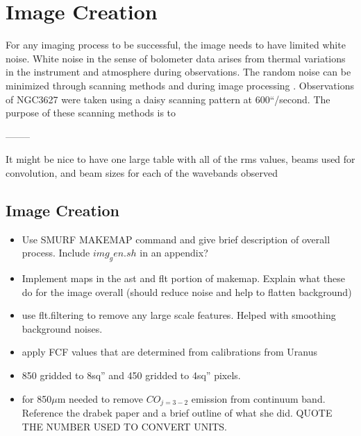 \section{Image Creation}

For any imaging process to be successful, the image needs to have limited white noise.  White noise in the sense of bolometer data arises from thermal variations in the instrument and atmosphere during observations. The random noise can be minimized through scanning methods and during image processing \citet{chapin2013}.  Observations of NGC3627 were taken using a daisy scanning pattern at 600``/second.  The purpose of these scanning methods is to 



--------

It might be nice to have one large table with all of the rms values, beams used for convolution, and beam sizes for each of the wavebands observed


\subsection{Image Creation}
\begin{itemize}
   \item Use SMURF MAKEMAP command and give brief description of overall process.  Include $img_gen.sh$ in an appendix?
   \item Implement maps in the ast and flt portion of makemap.  Explain what these do for the image overall (should reduce noise and help to flatten background)
   \item use flt.filtering to remove any large scale features.  Helped with smoothing background noises.
   \item apply FCF values that are determined from calibrations from Uranus
   \item 850 gridded to 8sq'' and 450 gridded to 4sq'' pixels.
   \item for 850$\mu$m needed to remove $CO_{j=3-2}$ emission from continuum band.  Reference the drabek paper and a brief outline of what she did.  QUOTE THE NUMBER USED TO CONVERT UNITS.
\end{itemize}

